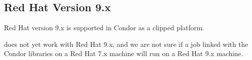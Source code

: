 \subsection{\label{sec:platform-linux-rh9}Red Hat Version 9.x}

Red Hat version 9.x is supported in Condor \VersionNotice as a clipped 
platform.

 does not yet work with Red Hat 9.x, and we are not
sure if a job linked with the Condor libraries on a Red Hat 7.x machine
will run on a Red Hat 9.x machine.  
